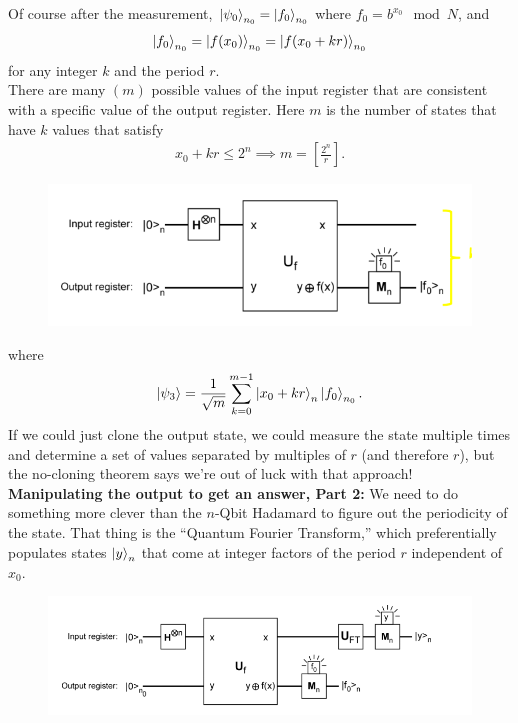 \documentclass{book}
\theoremstyle{definition}
\newcommand{\f}[2]{\frac{#1}{#2}}
\newcommand{\lb}{\left[}
\newcommand{\rb}{\right]}
\begin{document}
Of course after the measurement, $\ket{\psi_0}_{n_0} = \ket{f_0}_{n_0}$ where $f_0 = b^{x_0}\mod N$, and
\begin{align}
\ket{f_0}_{n_0}= \ket{f(x_0)}_{n_0} = \ket{f(x_0 + kr)}_{n_0}
\end{align}
for any integer $k$ and the period $r$. \\

There are many $(m)$ possible values of the input register that are
consistent with a specific value of the output register. Here $m$ is the number of states that have $k$ values that satisfy
\begin{align}
x_0 + kr \leq 2^n \implies m = \lb \f{2^n}{r} \rb.
\end{align}
\begin{figure}[!htb]
	\centering
	\includegraphics[scale=0.5]{shor4}
\end{figure}
where
\begin{align}
\ket{\psi_3} = \f{1}{\sqrt{m}} \sum^{m-1}_{k=0}\ket{x_0 + kr}_n \ket{f_0}_{n_0}.
\end{align}
If we could just clone the output state, we could measure the state multiple times and determine a set of values separated by multiples of $r$ (and therefore $r$), but the no-cloning theorem says we're out of luck with that approach!
\\







\noindent \textbf{Manipulating the output to get an answer, Part 2:} We need to do something more clever than the $n$-Qbit Hadamard to figure out the periodicity of the state. That thing is the ``Quantum Fourier Transform,'' which preferentially populates states $\ket{y}_n$
that come at integer factors of the period $r$ independent of $x_0$.  
\begin{figure}[!htb]
	\centering
	\includegraphics[scale=0.5]{shor5}
\end{figure}
\end{document}
